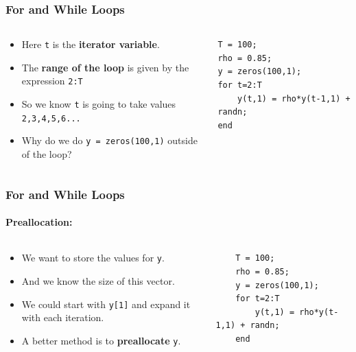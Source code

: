 \documentclass[11pt,xcolor={svgnames},aspectratio=169,usepdftitle=false]{beamer}
\begin{document}
\begin{frame}[fragile]
    \frametitle{For and While Loops}
\begin{columns}
    \begin{column}{0.5\textwidth}
        \begin{itemize}
            \item Here \verb;t; is the \alert{\textbf{iterator variable}}.
            \item The \alert{\textbf{range of the loop}} is given by the expression \verb;2:T;
            \item So we know \verb;t; is going to take values \verb;2,3,4,5,6...;
            \item Why do we do \verb;y = zeros(100,1); outside of the loop?
        \end{itemize}
    \end{column}
\begin{column}{0.5\textwidth}
\begin{lstlisting}
T = 100;
rho = 0.85;
y = zeros(100,1);
for t=2:T
    y(t,1) = rho*y(t-1,1) + randn;
end
\end{lstlisting}
\end{column}
\end{columns}
\end{frame}

\begin{frame}[fragile]
    \frametitle{For and While Loops}
    \framesubtitle{Preallocation:}
    \begin{columns}
        \begin{column}{0.5\textwidth}
            \begin{itemize}
                \item We want to store the values for \verb;y;.
                \item And we know the size of this vector.
                \item We could start with \verb;y[1]; and expand it with each iteration.
                \item A better method is to \alert{\textbf{preallocate}} \verb;y;.
            \end{itemize}
        \end{column}
    \begin{column}{0.5\textwidth}
    \begin{lstlisting}
    T = 100;
    rho = 0.85;
    y = zeros(100,1);
    for t=2:T
        y(t,1) = rho*y(t-1,1) + randn;
    end
    \end{lstlisting}
    \end{column}
    \end{columns}    
\end{frame}
\end{document}
